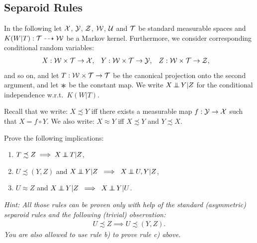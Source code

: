 \subsection{Separoid Rules}

In the following let $\mathcal{X}$, $\mathcal{Y}$, $\mathcal{Z}$, $\mathcal{W}$, $\mathcal{U}$ and $\mathcal{T}$ be standard measurable spaces and $K(W|T) : \mathcal{T} \dashrightarrow \mathcal{W}$ be a Markov kernel.
Furthermore, we consider corresponding conditional random variables:
\begin{align}
    X: \mathcal{W} \times \mathcal{T} &\to \mathcal{X}, &
    Y: \mathcal{W} \times \mathcal{T} &\to \mathcal{Y}, &
    Z: \mathcal{W} \times \mathcal{T} &\to \mathcal{Z}, 
\end{align}
and so on, and let $T: \mathcal{W} \times \mathcal{T} \to \mathcal{T}$ be the canonical projection onto the second argument, and let $\Asterisk$ be the constant map.
We write $X \operatorname*{\perp\mkern-11mu\perp} Y | Z$ for the conditional independence w.r.t.\ $K(W|T)$.

Recall that we write: $X \precsim Y$ iff there exists a measurable map $f:\mathcal{Y} \to \mathcal{X}$ such that $X = f \circ Y$. We also write: $X \approx Y$ iff $X \precsim Y$ and $Y \precsim X$.

Prove the following implications:
\begin{enumerate}[label=\alph*)]
    \item $T \precsim Z \implies X \operatorname*{\perp\mkern-11mu\perp} T |Z$,
    \item $U \precsim (Y,Z)$ and $X \operatorname*{\perp\mkern-11mu\perp} Y|Z \; \implies \; X \operatorname*{\perp\mkern-11mu\perp} U,Y|Z$,
    \item $U \approx Z$ and  $X \operatorname*{\perp\mkern-11mu\perp} Y |Z \;\implies\; X \operatorname*{\perp\mkern-11mu\perp} Y|U$.
\end{enumerate}
\emph{Hint: All those rules can be proven only with help of the standard (asymmetric) separoid rules and the following (trivial) observation:
\begin{align}
    U \precsim Z \implies U \precsim (Y,Z).
\end{align}
You are also allowed to use rule b) to prove rule c) above.
}

